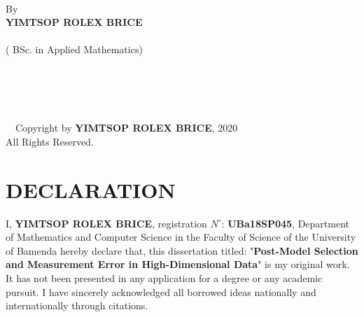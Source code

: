 \documentclass[a4paper,12pt,openany]{report}
\theoremstyle{plain}
\theoremstyle{plain}
\theoremstyle{plain}
\theoremstyle{plain}
\theoremstyle{plain}
\theoremstyle{plain}
\theoremstyle{plain}
\theoremstyle{plain}
\theoremstyle{plain}
\theoremstyle{plain}
\theoremstyle{plain}
\theoremstyle{plain}
\begin{document}
\begin{titlepage}
		\begin{center}
			\ \\
			By\\ 
			\large{\textbf{YIMTSOP ROLEX BRICE} }\\
			\\
			( BSc. in Applied Mathematics)\\
			\vspace*{2cm}
			 \\
			\fontsize{12}{14}\linespread{1.5}\\
			 \\
			\fontsize{12}{14}\linespread{1.5}\\
			\vspace*{3cm}
		\end{center}
	\end{titlepage}
	
	\begin{titlepage}
		\vspace*{23.5cm}
		\begin{center}
			\textcopyright\ \ Copyright by \textbf{YIMTSOP ROLEX BRICE}, 2020\\
			All Rights Reserved.
		\end{center}
	\end{titlepage}
	
	
	
	
	\chapter*{DECLARATION}
	\noindent
	I, \textbf{YIMTSOP ROLEX BRICE},
	 registration $N^{\circ}$: \textbf{UBa18SP045}, Department of Mathematics and Computer Science in the Faculty of Science of the University of Bamenda hereby declare
	that, this dissertation titled: "\textbf{Post-Model Selection and Measurement Error in High-Dimensional Data}" is my original work. It has not been presented in any application for a degree or any academic pursuit. I have sincerely acknowledged all borrowed ideas nationally and internationally through citations.
	\vspace{2cm}
	
\end{document}
